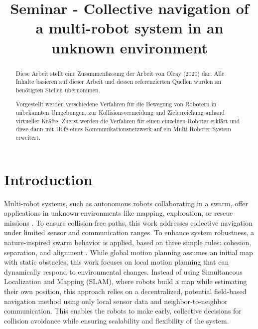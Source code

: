 \documentclass[conference]{IEEEtran}
\begin{document}
\title{Seminar - Collective navigation of a multi-robot system in an unknown environment}
\author{
}

\maketitle


\begin{abstract}
Diese Arbeit stellt eine Zusammenfassung der Arbeit von Olcay (2020) \cite{Olcay.2020} dar. 
Alle Inhalte basieren auf dieser Arbeit und dessen referenzierten Quellen wurden 
an benötigten Stellen übernommen.

Vorgestellt werden verschiedene Verfahren für die Bewegung von Robotern in unbekannten Umgebungen,
zur Kollisionsvermeidung und Zielerreichung anhand virtueller Kräfte. Zuerst werden die Verfahren
für einen einzelnen Roboter erklärt und diese dann mit Hilfe eines Kommunikationsnetzwerk auf 
ein Multi-Roboter-System erweitert.
\end{abstract}

\section{Introduction}
Multi-robot systems, such as autonomous robots collaborating in a swarm, 
offer applications in unknown environments like mapping, exploration, or 
rescue missions \cite{Stormont.null}. 
To ensure collision-free paths, this work addresses 
collective navigation under limited sensor and communication ranges. To 
enhance system robustness, a nature-inspired swarm behavior is applied, 
based on three simple rules: cohesion, separation, and alignment 
\cite{Reynolds.1987}. 
While global motion planning assumes an initial map with static obstacles, 
this work focuses on local motion planning that can dynamically respond 
to environmental changes. Instead of using Simultaneous Localization and 
Mapping (SLAM), where robots build a map while estimating their own 
position, this approach relies on a decentralized, potential field-based 
navigation method using only local sensor data and neighbor-to-neighbor 
communication. This enables the robots to make early, collective decisions 
for collision avoidance while ensuring scalability and flexibility of 
the system.
\end{document}
